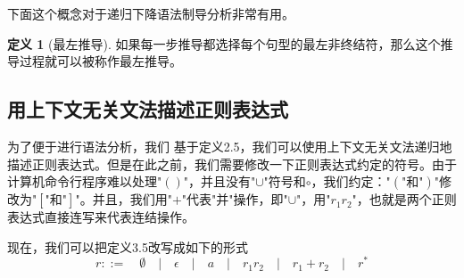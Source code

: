 \documentclass[openany,oneside]{book}
\theoremstyle{definition}
\newtheorem{definition}{\hspace{2em}定义}[chapter]
\theoremstyle{definition}
\begin{document}
 	下面这个概念对于递归下降语法制导分析非常有用。
 	\begin{definition}[最左推导]
 		如果每一步推导都选择每个句型的最左非终结符，那么这个推导过程就可以被称作最左推导。
 	\end{definition}
	\subsection{用上下文无关文法描述正则表达式}
	为了便于进行语法分析，我们
	基于定义2.5，我们可以使用上下文无关文法递归地描述正则表达式。但是在此之前，我们需要修改一下正则表达式约定的符号。由于计算机命令行程序难以处理"\(\left(\right)\)"，并且没有"\(\cup\)"符号和\(\circ\)，我们约定：\(\mbox{"}\left(\mbox{"和"}\right)\mbox{"}\)修改为\(\mbox{"}\left[  \mbox{"和"}\right]\mbox{"}\)。并且，我们用"\(+\)"代表"并"操作，即"\(\cup\)"，用"\(r_1 r_2\)"，也就是两个正则表达式直接连写来代表连结操作。
	
	现在，我们可以把定义3.5改写成如下的形式
	\begin{equation}
		r::= \quad \emptyset \quad| \quad\epsilon\quad |\quad a \quad  |\quad r_1 r_2\quad |\quad r_1 + r_2\quad | \quad r^*
	\end{equation}
	
\end{document}
